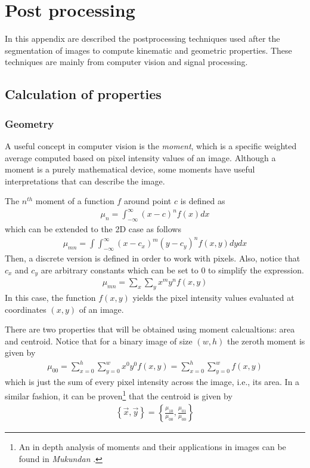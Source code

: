 \chapter{Post processing}\label{appendix_postproc}

In this appendix are described the postprocessing techniques used after the segmentation of images to compute kinematic and geometric properties. These techniques are mainly from computer vision and signal processing.

\section{Calculation of properties}\label{appendix_b1}
\subsection{Geometry}
A useful concept in computer vision is the \textit{moment}, which is a specific weighted average computed based on pixel intensity values of an image. Although a moment is a purely mathematical device, some moments have useful interpretations that can describe the image.

The $n^{th}$ moment of a function $f$ around point $c$ is defined as 
\begin{align*}
    \mu_n=\int_{-\infty}^{\infty}(x-c)^nf(x)dx
\end{align*}
which can be extended to the 2D case as follows
\begin{align*}
    \mu_{mn}=\int\int_{-\infty}^{\infty}(x-c_x)^m(y-c_y)^nf(x,y)dydx
\end{align*}
Then, a discrete version is defined in order to work with pixels. Also, notice that $c_x$ and $c_y$ are arbitrary constants which can be set to $0$ to simplify the expression.
\begin{align*}
    \mu_{mn}=\sum_{x}\sum_{y}x^my^nf(x,y)
\end{align*}
In this case, the function $f(x,y)$ yields the pixel intensity values evaluated at coordinates $(x,y)$ of an image.

There are two properties that will be obtained using moment calcualtions: area and centroid. Notice that for a binary image of size $(w, h)$ the zeroth moment is given by
\begin{align*}
    \mu_{00}=\sum_{x=0}^{h}\sum_{y=0}^{w}x^0y^0f(x,y) = \sum_{x=0}^{h}\sum_{y=0}^{w}f(x,y)
\end{align*}
which is just the sum of every pixel intensity across the image, i.e., its area. In a similar fashion, it can be proven\footnote{An in depth analysis of moments and their applications in images can be found in \textit{Mukundan} \cite{image_moment}.} that the centroid is given by
\begin{align*}
    \left\{\Vec{x},\Vec{y}\right\}=\left\{\frac{\mu_{10}}{\mu_{00}},\frac{\mu_{01}}{\mu_{00}}\right\}
\end{align*}

